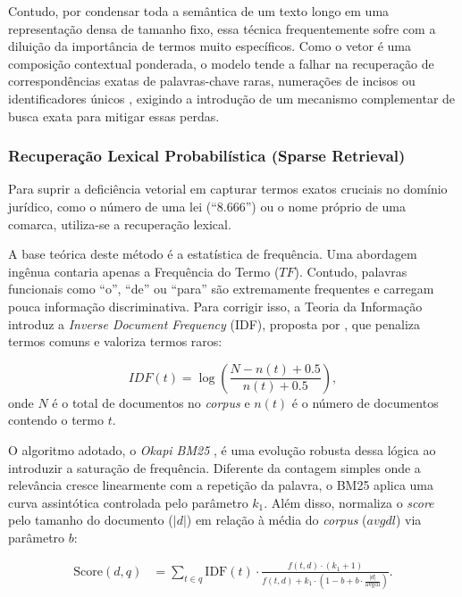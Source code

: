 Contudo, por condensar toda a semântica de um texto longo em uma representação densa de tamanho fixo, essa técnica frequentemente sofre com a diluição da importância de termos muito específicos. Como o vetor é uma composição contextual ponderada, o modelo tende a falhar na recuperação de correspondências exatas de palavras-chave raras, numerações de incisos ou identificadores únicos \citep{manning2008}, exigindo a introdução de um mecanismo complementar de busca exata para mitigar essas perdas.

\subsubsection{Recuperação Lexical Probabilística (Sparse Retrieval)}

Para suprir a deficiência vetorial em capturar termos exatos cruciais no domínio jurídico, como o número de uma lei (``8.666'') ou o nome próprio de uma comarca, utiliza-se a recuperação lexical.

A base teórica deste método é a estatística de frequência. Uma abordagem ingênua contaria apenas a Frequência do Termo ($TF$). Contudo, palavras funcionais como ``o'', ``de'' ou ``para'' são extremamente frequentes e carregam pouca informação discriminativa. Para corrigir isso, a Teoria da Informação introduz a \textit{Inverse Document Frequency} (IDF), proposta por \citet{sparckjones1972}, que penaliza termos comuns e valoriza termos raros:

\begin{equation}
  IDF(t) = \log \left( \frac{N - n(t) + 0.5}{n(t) + 0.5} \right),
\end{equation}
onde $N$ é o total de documentos no \textit{corpus} e $n(t)$ é o número de documentos contendo o termo $t$.

O algoritmo adotado, o \textit{Okapi BM25} \citep{robertson1995}, é uma evolução robusta dessa lógica ao introduzir a saturação de frequência. Diferente da contagem simples onde a relevância cresce linearmente com a repetição da palavra, o BM25 aplica uma curva assintótica controlada pelo parâmetro $k_1$. Além disso, normaliza o \textit{score} pelo tamanho do documento ($|d|$) em relação à média do \textit{corpus} ($avgdl$) via parâmetro $b$:

\begin{align}
  \label{eq:bm25}
  \text{Score}(d, q) &= \sum_{t \in q} \text{IDF}(t) \cdot \frac{f(t, d) \cdot (k_1 + 1)}{f(t, d) + k_1 \cdot \left(1 - b + b \cdot \frac{|d|}{\text{avgdl}}\right)}.
\end{align}

